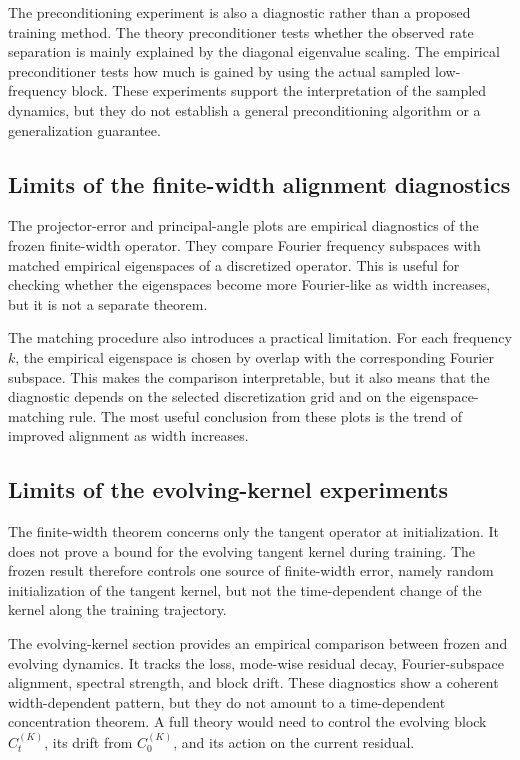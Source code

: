 The preconditioning experiment is also a diagnostic rather than a proposed
training method. The theory preconditioner tests whether the observed rate
separation is mainly explained by the diagonal eigenvalue scaling. The empirical
preconditioner tests how much is gained by using the actual sampled
low-frequency block. These experiments support the interpretation of the
sampled dynamics, but they do not establish a general preconditioning algorithm
or a generalization guarantee.

\subsection{Limits of the finite-width alignment diagnostics}
\label{subsec:discussion-limitations-alignment}

The projector-error and principal-angle plots are empirical diagnostics of the
frozen finite-width operator. They compare Fourier frequency subspaces with
matched empirical eigenspaces of a discretized operator. This is useful for
checking whether the eigenspaces become more Fourier-like as width increases,
but it is not a separate theorem.

The matching procedure also introduces a practical limitation. For each
frequency \(k\), the empirical eigenspace is chosen by overlap with the
corresponding Fourier subspace. This makes the comparison interpretable, but it
also means that the diagnostic depends on the selected discretization grid and
on the eigenspace-matching rule. The most useful conclusion from these plots is
the trend of improved alignment as width increases.

\subsection{Limits of the evolving-kernel experiments}
\label{subsec:discussion-limitations-evolving}

The finite-width theorem concerns only the tangent operator at initialization.
It does not prove a bound for the evolving tangent kernel during training. The
frozen result therefore controls one source of finite-width error, namely random
initialization of the tangent kernel, but not the time-dependent change of the
kernel along the training trajectory.

The evolving-kernel section provides an empirical comparison between frozen and
evolving dynamics. It tracks the loss, mode-wise residual decay,
Fourier-subspace alignment, spectral strength, and block drift. These
diagnostics show a coherent width-dependent pattern, but they do not amount to a
time-dependent concentration theorem. A full theory would need to control the
evolving block \(C_t^{(K)}\), its drift from \(C_0^{(K)}\), and its action on the
current residual.

